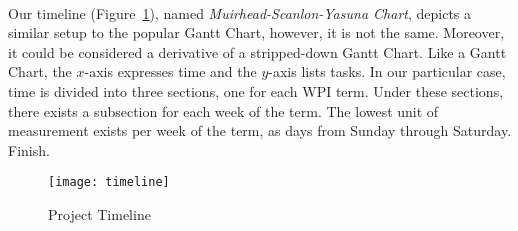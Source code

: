 \paragraph{}
Our timeline (Figure~\ref{fig:project_timeline}), named \textit{Muirhead-Scanlon-Yasuna Chart}, depicts a similar setup to the popular Gantt Chart, however, it is not the same. Moreover, it could be considered a derivative of a stripped-down Gantt Chart. Like a Gantt Chart, the $x$-axis expresses time and the $y$-axis lists tasks. In our particular case, time is divided into three sections, one for each WPI term. Under these sections, there exists a subsection for each week of the term. The lowest unit of measurement exists per week of the term, as days from Sunday through Saturday. \TODO Finish.

\begin{figure}[H]
    \centering
    \texttt{[image: timeline]}
    \caption{Project Timeline}
    \label{fig:project_timeline}
\end{figure}
